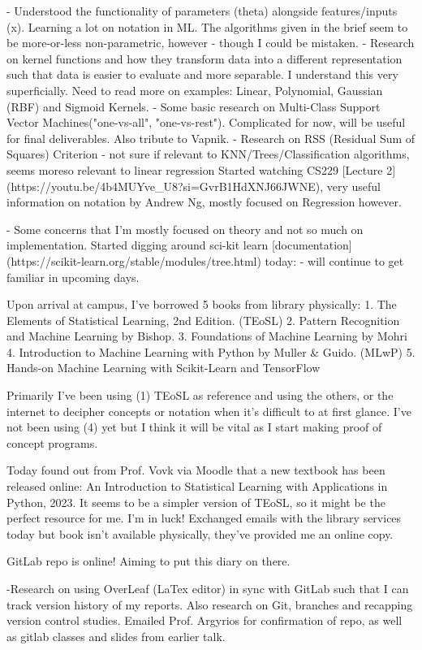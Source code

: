 \documentclass[letterpaper,10pt]{article}
\begin{document}
\begin{markdown}
- Understood the functionality of parameters (theta) alongside features/inputs (x). Learning a lot on notation in ML. The algorithms given in the brief seem to be more-or-less non-parametric, however - though I could be mistaken.
- Research on kernel functions and how they transform data into a different representation such that data is easier to evaluate and more separable. I understand this very superficially. Need to read more on examples: Linear, Polynomial, Gaussian (RBF) and Sigmoid Kernels.
- Some basic research on Multi-Class Support Vector Machines("one-vs-all", "one-vs-rest"). Complicated for now, will be useful for final deliverables. Also tribute to Vapnik. 
- Research on RSS (Residual Sum of Squares) Criterion - not sure if relevant to KNN/Trees/Classification algorithms, seems moreso relevant to linear regression
Started watching CS229 [Lecture 2](https://youtu.be/4b4MUYve_U8?si=GvrB1HdXNJ66JWNE), very useful information on notation by Andrew Ng, mostly focused on Regression however. 

- Some concerns that I'm mostly focused on theory and not so much on implementation. Started digging around sci-kit learn [documentation](https://scikit-learn.org/stable/modules/tree.html) today: - will continue to get familiar in upcoming days.

Upon arrival at campus, I've borrowed 5 books from library physically:
1. The Elements of Statistical Learning, 2nd Edition. (TEoSL)
2. Pattern Recognition and Machine Learning by Bishop. 
3. Foundations of Machine Learning by Mohri
4. Introduction to Machine Learning with Python by Muller & Guido. (MLwP)
5. Hands-on Machine Learning with Scikit-Learn and TensorFlow

Primarily I've been using (1) TEoSL as reference and using the others, or the internet to decipher concepts or notation when it's difficult to at first glance.
I've not been using (4) yet but I think it will be vital as I start making proof of concept programs. 

Today found out from Prof. Vovk via Moodle that a new textbook has been released online: An Introduction to Statistical Learning with Applications in Python, 2023. It seems to be a simpler version of TEoSL, so it might be the perfect resource for me. I'm in luck!
Exchanged emails with the library services today but book isn't available physically, they've provided me an online copy. 

GitLab repo is online! Aiming to put this diary on there.

-Research on using OverLeaf (LaTex editor) in sync with GitLab such that I can track version history of my reports. Also research on Git, branches and recapping version control studies. Emailed Prof. Argyrios for confirmation of repo, as well as gitlab classes and slides from earlier talk. 


\end{markdown}
\end{document}
